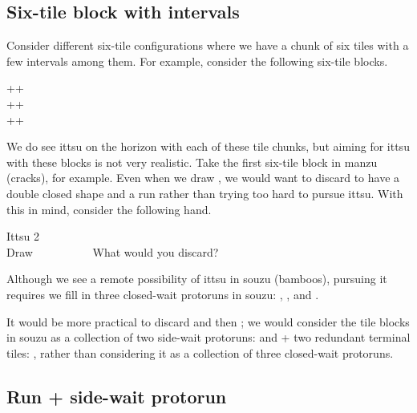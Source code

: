 \bigskip
\subsection{Six-tile block with intervals}
Consider different six-tile configurations where we have a chunk of six tiles with a few intervals among them. For example, consider the following six-tile blocks. 

\bigskip
{\begin{center}
{\Huge{}++}\\ [\sep]
{\Huge{}++}\\ [\sep]
{\Huge{}++}
\end{center}}

\bigskip
We do see {\jap ittsu} on the horizon with each of these tile chunks, but aiming for {\jap ittsu} with these blocks is not very realistic. Take the first six-tile block in {\jap manzu} (cracks), for example. Even when we draw {\LARGE{}}, we would want to discard {\LARGE{}} to have a double closed shape {\LARGE{}} and a run {\LARGE {}} rather than trying too hard to pursue {\jap ittsu}. 
With this in mind, consider the following hand. 

\bigskip
\begin{itembox}[r]{{\jap Ittsu} 2}
\bp
{}~\\
\hfill\footnotesize{Draw~~~~~~~~~~}
\ep
\vspace{-17pt}What would you discard? \vspace{-5pt}
\end{itembox}

\bigskip
Although we see a remote possibility of {\jap ittsu} in {\jap souzu} (bamboos), pursuing it requires we fill in three closed-wait protoruns in {\jap souzu}: {\LARGE{}}, {\LARGE{}}, and {\LARGE{}}.

\bigskip
It would be more practical to discard {\LARGE{}} and then {\LARGE{}}; we would consider the tile blocks in {\jap souzu} as a collection of two side-wait protoruns: {\LARGE{}} and {\LARGE{}} + two redundant terminal tiles: {\LARGE{} }, rather than considering it as a collection of three closed-wait protoruns.

\bigskip
\subsection{Run + side-wait protorun}

